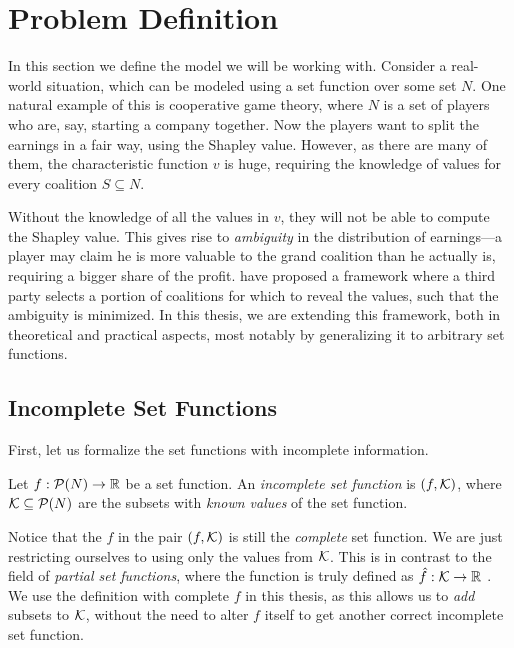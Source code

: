 \chapter{Problem Definition}

In this section we define the model we will be working with.
Consider a real-world situation, which can be modeled using a set function over some set $ N $.
One natural example of this is cooperative game theory, where $ N $ is a set of players who are, say, starting a company together.
Now the players want to split the earnings in a fair way, using the Shapley value.
However, as there are many of them, the characteristic function $ v $ is huge, requiring the knowledge of values for every coalition $ S \subseteq N $.

Without the knowledge of all the values in $ v $, they will not be able to compute the Shapley value.
This gives rise to \emph{ambiguity} in the distribution of earnings---a player may claim he is more valuable to the grand coalition than he actually is, requiring a bigger share of the profit.
\cite{uradnik2024reducing} have proposed a framework where a third party selects a portion of coalitions for which to reveal the values, such that the ambiguity is minimized.
In this thesis, we are extending this framework, both in theoretical and practical aspects, most notably by generalizing it to arbitrary set functions.

\section{Incomplete Set Functions}

First, let us formalize the set functions with incomplete information.

\begin{defi}
  Let $ f: \mathcal{P}\!\left(N\right) \to \mathbb{R} $ be a set function.
  An \emph{incomplete set function} is $ \left( f, \mathcal{K} \right) $, where $ \mathcal{K} \subseteq \mathcal{P}\!\left(N\right) $ are the subsets with \emph{known values} of the set function.
\end{defi}

Notice that the $ f $ in the pair $ \left( f, \mathcal{K} \right) $ is still the \emph{complete} set function.
We are just restricting ourselves to using only the values from $ \mathcal{K} $.
This is in contrast to the field of \emph{partial set functions}, where the  function is truly defined as $ \hat f: \mathcal{K} \to \mathbb{R} $ \citep{CERNY202462}.
We use the definition with complete $ f $ in this thesis, as this allows us to \emph{add} subsets to $ \mathcal{K} $, without the need to alter $ f $ itself to get another correct incomplete set function.

